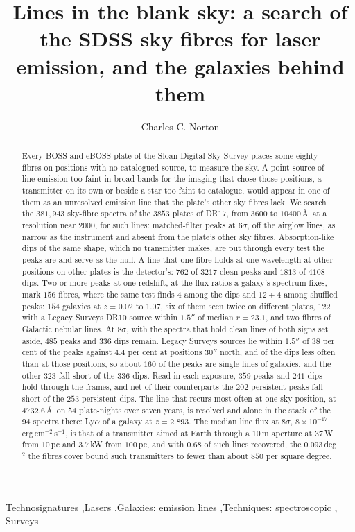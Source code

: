 \documentclass[3p,11pt]{elsarticle}
\newcommand{\flux}{erg\,cm$^{-2}$\,s$^{-1}$}
\begin{document}
\begin{frontmatter}

\title{Lines in the blank sky: a search of the SDSS sky fibres for laser emission, and the galaxies behind them}

\author{Charles C. Norton}

\begin{abstract}
Every BOSS and eBOSS plate of the Sloan Digital Sky Survey places some eighty fibres on
positions with no catalogued source, to measure the sky. A point source of line emission
too faint in broad bands for the imaging that chose those positions, a transmitter on
its own or beside a star too faint to catalogue, would appear in one of them as an
unresolved emission line that the plate's other sky fibres lack. We search the
$381{,}943$ sky-fibre spectra of the $3853$ plates of DR17, from $3600$ to
$10400$\,\AA\ at a resolution near $2000$, for such lines: matched-filter peaks at
$6\sigma$, off the airglow lines, as narrow as the instrument and absent from the plate's
other sky fibres. Absorption-like dips of the same shape, which no transmitter makes, are
put through every test the peaks are and serve as the null. A line that one fibre holds
at one wavelength at other positions on other plates is the detector's: $762$ of $3217$
clean peaks and $1813$ of $4108$ dips. Two or more peaks at one redshift, at the flux
ratios a galaxy's spectrum fixes, mark $156$ fibres, where the same test finds $4$ among
the dips and $12\pm4$ among shuffled peaks: $154$ galaxies at $z=0.02$ to $1.07$, six of
them seen twice on different plates, $122$ with a Legacy Surveys DR10 source within
$1.5''$ of median $r=23.1$, and two fibres of Galactic nebular lines. At $8\sigma$, with
the spectra that hold clean lines of both signs set aside, $485$ peaks and $336$ dips
remain. Legacy Surveys sources lie within $1.5''$ of $38$ per cent of the peaks against
$4.4$ per cent at positions $30''$ north, and of the dips less often than at those
positions, so about $160$ of the peaks are single lines of galaxies, and the other $323$
fall short of the $336$ dips. Read in each exposure, $359$ peaks and $241$ dips hold
through the frames, and net of their counterparts the $202$ persistent peaks fall short of
the $253$ persistent dips. The line that recurs most often at one sky position, at
$4732.6$\,\AA\ on $54$ plate-nights over seven years, is resolved and alone in the stack
of the $94$ spectra there: Ly$\alpha$ of a galaxy at $z=2.893$. The median line flux at
$8\sigma$, $8\times10^{-17}$\,\flux, is that of a transmitter aimed at Earth through a
$10$\,m aperture at $37$\,W from $10$\,pc and $3.7$\,kW from $100$\,pc, and with $0.68$
of such lines recovered, the $0.093$\,deg$^2$ the fibres cover bound such transmitters to
fewer than about $850$ per square degree.
\end{abstract}

\begin{keyword}
Technosignatures \sep Lasers \sep Galaxies: emission lines \sep Techniques: spectroscopic \sep
Surveys
\end{keyword}

\end{frontmatter}
\end{document}
